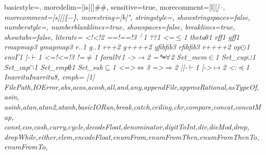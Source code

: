  {
	basicstyle=\ttfamily\codesize,
	moredelim=[is][\showfocus]{\#}{\#},
	sensitive=true,
	morecomment=[l][\color{gray_ulisses}\ttfamily\itshape\codesize]{--},
	morecomment=[s][\color{gray_ulisses}\ttfamily\itshape\codesize]{\{-}{-\}},
	morestring=[b]",
	stringstyle=\color{haskellstr},
	showstringspaces=false,
	numberstyle=\codesize,
	numberblanklines=true,
	showspaces=false,
	breaklines=true,
	showtabs=false,
  literate={
	         {<!}{{{\color{lcolor}<!}}}2
           {==!}{{{\color{lcolor}==!}}}3
           {`}{{{$^{\backprime}{}$}}}1
           {?}{{{\color{lcolor}?}}}1
           {<=}{{$\leq$}}1
           {theta}{{$\theta$}}1
           {rf}{{{\color{lappcolor}f}}}1
           {gf}{{{\color{lappascolor}f}}}1
           {rmap}{{{\color{lappcolor}map}}}3
           {gmap}{{{\color{lappascolor}map}}}3
           {r.}{{{\color{lappcolor}.}}}1
           {g.}{{{\color{lappascolor}.}}}1
           {r++}{{{\showfocus{++}}}}2
           {g++}{{{\color{lappascolor}++}}}2
           {gfib}{{{\color{lappascolor}fib}}}3
           {rfib}{{{\color{lappcolor}fib}}}3
           {r++}{{{\color{lappcolor}++}}}2
           {op}{{$\odot$}}1
           {env}{{$\Gamma$}}1
           {|-}{{$\vdash$}}1
           {<=!}{{{\color{lcolor}<=!}}}3
           {!=}{{$\neq$}}1
           {forall}{{$\forall$}}1
           {->}{{$\rightarrow$}}2
           {=*}{{$\texttt{=}\forall$}}2
           {Set_mem}{{$\in$}}1
           {Set_cup}{{$\cup$}}1
           {Set_cap}{{$\cap$}}1
           {Set_emp}{{$\emptyset$}}1
           {Set_sub}{{$\subseteq$}}1
           {<=>}{{$\Leftrightarrow$}}3
           {=>}{{$\Rightarrow$}}2
           {||-}{{$\vdash$}}1
           {|->}{{$\mapsto$}}2
           {<:}{{$\preceq$}}1
           {Inarritu}{Inarritu}8},
	emph=
	{[1]
		FilePath,IOError,abs,acos,acosh,all,and,any,appendFile,approxRational,asTypeOf,asin,
		asinh,atan,atan2,atanh,basicIORun,break,catch,ceiling,chr,compare,concat,concatMap,
		const,cos,cosh,curry,cycle,decodeFloat,denominator,digitToInt,div,divMod,drop,
		dropWhile,either,elem,encodeFloat,enumFrom,enumFromThen,enumFromThenTo,enumFromTo,
}}
